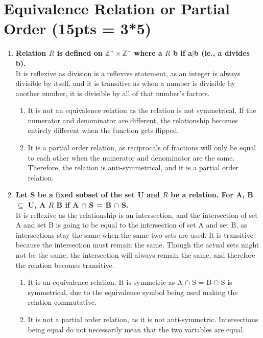 \documentclass[a4paper]{article}
\begin{document}
\section{Equivalence Relation or Partial Order (15pts = 3*5)}
\begin{enumerate}
    \item \boldmath \textbf{Relation $R$ is defined on $\mathbb{Z}^+ \times \mathbb{Z}^+$ where a $R$ b if a$|$b (ie., a divides b).} \unboldmath\\
    It is reflexive as division is a reflexive statement, as an integer is always divisible by itself, and it is transitive as when a number is divisible by another number, it is divisible by all of that number's factors.
    
    \begin{enumerate}
        \item It is not an equivalence relation as the relation is not symmetrical. If the numerator and denominator are different, the relationship becomes entirely different when the function gets flipped.
        \item It is a partial order relation, as reciprocals of fractions will only be equal to each other when the numerator and denominator are the same. Therefore, the relation is anti-symmetrical, and it is a partial order relation.
    \end{enumerate}
    
    \item \boldmath \textbf{Let S be a fixed subset of the set U and $R$ be a relation. For A, B $\subseteq$ U, A $R$ B if A $\cap$ S = B $\cap$ S.} \unboldmath \\
    It is reflexive as the relationship is an intersection, and the intersection of set A and set B is going to be equal to the intersection of set A and set B, as intersections stay the same when the same two sets are used. It is transitive because the intersection must remain the same. Though the actual sets might not be the same, the intersection will always remain the same, and therefore the relation becomes transitive.
    \begin{enumerate}
        \item It is an equivalence relation. It is symmetric as A $\cap$ S = B $\cap$ S is symmetrical, due to the equivalence symbol being used making the relation commutative.
        \item It is not a partial order relation, as it is not anti-symmetric. Intersections being equal do not necessarily mean that the two variables are equal.
    \end{enumerate}
    

\end{enumerate}
\end{document}
